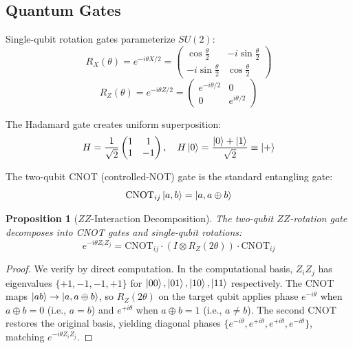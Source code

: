 \documentclass[11pt]{article}
\newtheorem{proposition}[theorem]{Proposition}
\begin{document}
\subsection{Quantum Gates}

Single-qubit rotation gates parameterize $SU(2)$:
\begin{equation}
R_X(\theta) = e^{-i\theta X/2} = \begin{pmatrix} \cos\frac{\theta}{2} & -i\sin\frac{\theta}{2} \\ -i\sin\frac{\theta}{2} & \cos\frac{\theta}{2} \end{pmatrix}
\end{equation}
\begin{equation}
R_Z(\theta) = e^{-i\theta Z/2} = \begin{pmatrix} e^{-i\theta/2} & 0 \\ 0 & e^{i\theta/2} \end{pmatrix}
\end{equation}

The Hadamard gate creates uniform superposition:
\begin{equation}
H = \frac{1}{\sqrt{2}}\begin{pmatrix} 1 & 1 \\ 1 & -1 \end{pmatrix}, \quad H\ket{0} = \frac{\ket{0}+\ket{1}}{\sqrt{2}} \equiv \ket{+}
\end{equation}

The two-qubit CNOT (controlled-NOT) gate is the standard entangling gate:
\begin{equation}
\text{CNOT}_{ij}\ket{a,b} = \ket{a, a\oplus b}
\end{equation}

\begin{proposition}[$ZZ$-Interaction Decomposition]
\label{prop:zz_decomp}
The two-qubit $ZZ$-rotation gate decomposes into CNOT gates and single-qubit rotations:
\begin{equation}
e^{-i\theta Z_i Z_j} = \text{CNOT}_{ij} \cdot (I \otimes R_Z(2\theta)) \cdot \text{CNOT}_{ij}
\label{eq:zz_decomp}
\end{equation}
\end{proposition}

\begin{proof}
We verify by direct computation. In the computational basis, $Z_i Z_j$ has eigenvalues $\{+1, -1, -1, +1\}$ for $\ket{00}, \ket{01}, \ket{10}, \ket{11}$ respectively. The CNOT maps $\ket{ab} \to \ket{a, a\oplus b}$, so $R_Z(2\theta)$ on the target qubit applies phase $e^{-i\theta}$ when $a \oplus b = 0$ (i.e., $a=b$) and $e^{+i\theta}$ when $a \oplus b = 1$ (i.e., $a \neq b$). The second CNOT restores the original basis, yielding diagonal phases $\{e^{-i\theta}, e^{+i\theta}, e^{+i\theta}, e^{-i\theta}\}$, matching $e^{-i\theta Z_i Z_j}$.
\end{proof}
\end{document}
